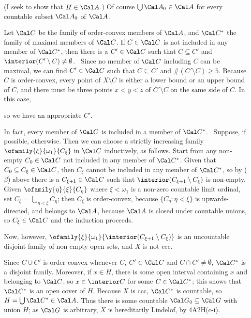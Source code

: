{

\noindent   (I seek to show that
$H\in\Cal A$.)   Of course $\bigcup\Cal A_0\in\Cal A$ for every
countable subset $\Cal A_0$ of $\Cal A$.

\medskip

 Let $\Cal C$ be the family of order-convex members
of $\Cal A$, and $\Cal C^*$ the family
of maximal members of $\Cal C$.   If $C\in\Cal C$ is not included in any
member of $\Cal C^*$, then there is a $C'\in\Cal C$ such that
$C\subseteq C'$ and $\interior(C'\setminus C)\ne\emptyset$.   \Prf\
Since no member of $\Cal C$ including $C$ can be maximal, we can find
$C'\in\Cal C$ such that $C\subseteq C'$ and $\#(C'\setminus C)\ge 5$.
Because $C$ is order-convex, every point of $X\setminus C$ is either a
lower bound or an upper bound of $C$, and there must be three points
$x<y<z$ of $C'\setminus C$ on the same side of $C$.   In this case,


\noindent so we have an appropriate $C'$.\ \Qed

\medskip

 In fact, every member of $\Cal C$ is included in a
member of
$\Cal C^*$.   \Prf\Quer\ Suppose, if possible, otherwise.   Then we can
choose a strictly increasing family $\ofamily{\xi}{\omega_1}{C_{\xi}}$
in $\Cal C$  inductively, as follows.   Start from any non-empty
$C_0\in\Cal C$ not included in any member of $\Cal C^*$.   Given that
$C_0\subseteq C_{\xi}\in\Cal C$, then $C_{\xi}$ cannot be included in
any member of $\Cal C^*$, so by ($\beta$) above there is a
$C_{\xi+1}\in\Cal C$ such that
$\interior(C_{\xi+1}\setminus C_{\xi})$ is non-empty.   Given
$\ofamily{\eta}{\xi}{C_{\eta}}$ where $\xi<\omega_1$ is a non-zero
countable limit ordinal, set $C_{\xi}=\bigcup_{\eta<\xi}C_{\eta}$;  then
$C_{\xi}$ is order-convex, because $\{C_{\eta}:\eta<\xi\}$ is
upwards-directed, and belongs to $\Cal A$, because $\Cal A$ is closed
under countable unions, so $C_{\xi}\in\Cal C$ and the induction
proceeds.

Now, however,
$\ofamily{\xi}{\omega_1}{\interior(C_{\xi+1}\setminus C_{\xi})}$ is an
uncountable disjoint family of non-empty open sets, and $X$ is not ccc.\
\Bang\Qed

\medskip

 Since $C\cup C'$ is order-convex whenever $C$,
$C'\in\Cal C$ and $C\cap C'\ne\emptyset$, $\Cal C^*$ is a disjoint
family.   Moreover, if $x\in H$, there is some open interval containing
$x$ and belonging to $\Cal C$, so $x\in\interior C$ for some
$C\in\Cal C^*$;  this shows that $\Cal C^*$ is an open cover of $H$.
Because $X$ is ccc, $\Cal C^*$ is countable, so
$H=\bigcup\Cal C^*\in\Cal A$.   Thus there is some countable
$\Cal G_0\subseteq\Cal G$ with union $H$;  as $\Cal G$ is arbitrary, $X$
is hereditarily Lindel\"of, by 4A2H(c-i).

}
